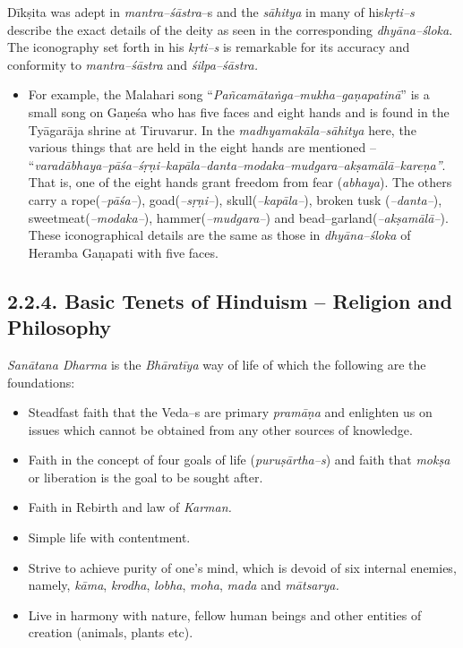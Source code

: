 Dīkṣita was adept in \textit{mantra–śāstra}–s and the \textit{sāhitya} in many of his\break \textit{kṛti–s} describe the exact details of the deity as seen in the corresponding \textit{dhyāna–śloka}. The iconography set forth in his \textit{kṛti–s} is remarkable for its accuracy and conformity to \textit{mantra–śāstra} and \textit{śilpa–śāstra.}

\begin{itemize}
\item For example, the Malahari song “\textit{Pañcamātaṅga–mukha–gaṇapa\-tinā}” is a small song on Gaṇeśa who has five faces and eight hands and is found in the Tyāgarāja shrine at Tiruvarur. In the \textit{madhyamakāla–sāhitya} here, the various things that are held in the eight hands are mentioned – “\textit{varadābhaya–pāśa–śṛṇi–kapāla–danta–modaka–mudgara–akṣamālā–kareṇa”}. That is, one of the eight hands grant freedom from fear (\textit{abhaya}). The others carry a rope(\textit{–pāśa–}), goad(\textit{–sṛṇi–}), skull(\textit{–kapāla–}), broken tusk (\textit{–danta–}), sweetmeat(\textit{–modaka–}), hammer(\textit{–mudgara–}) and bead–garland(\textit{–akṣamālā–}). These iconographical details are the same as those in \textit{dhyāna–śloka} of Heramba Gaṇapati with five faces.

\end{itemize}



\subsection*{2.2.4. Basic Tenets of Hinduism – Religion and Philosophy}

\textit{Sanātana Dharma} is the \textit{Bhāratīya} way of life of which the following are the foundations:

\begin{itemize}
\item Steadfast faith that the Veda–s are primary \textit{pramāṇa} and enlighten us on issues which cannot be obtained from any other sources of knowledge.

 \item Faith in the concept of four goals of life (\textit{puruṣārtha–s}) and faith that \textit{mokṣa} or liberation is the goal to be sought after.

 \item Faith in Rebirth and law of \textit{Karman.}

 \item Simple life with contentment.

 \item Strive to achieve purity of one’s mind, which is devoid of six internal enemies, namely, \textit{kāma}, \textit{krodha}, \textit{lobha}, \textit{moha}, \textit{mada} and \textit{mātsarya.}

 \item Live in harmony with nature, fellow human beings and other entities of creation (animals, plants etc).

\end{itemize}

